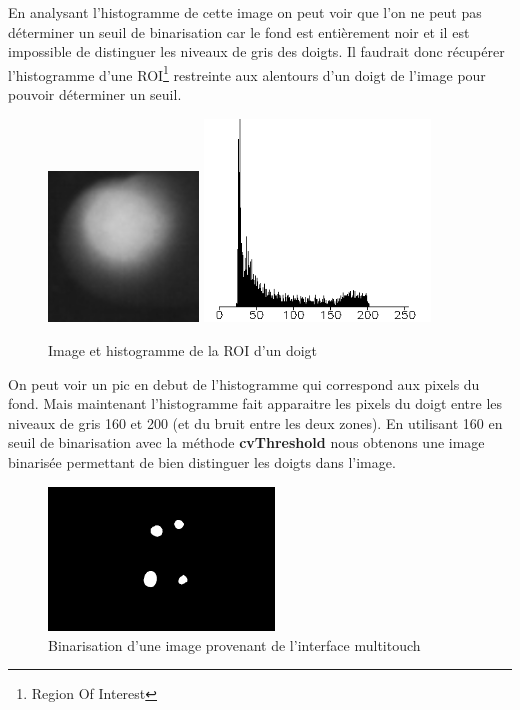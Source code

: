 En analysant l'histogramme de cette image on peut voir que l'on ne peut pas déterminer un seuil de 
binarisation car le fond est entièrement noir et il est impossible de distinguer les niveaux de gris des doigts.
Il faudrait donc récupérer l'histogramme d'une ROI\footnote{Region Of Interest} restreinte aux alentours d'un doigt de l'image pour pouvoir déterminer un seuil.

\begin{figure}[H]
      \center
      \includegraphics[width=4cm]{ressources/tp4/roi.png}
      \includegraphics[width=6cm]{ressources/tp4/histoROI.png}
      \caption{Image et histogramme de la ROI d'un doigt}
\end{figure}

On peut voir un pic en debut de l'histogramme qui correspond aux pixels du fond. Mais maintenant 
l'histogramme fait apparaitre les pixels du doigt entre les niveaux de gris 160 et 200 (et du bruit entre les deux zones).
En utilisant 160 en seuil de binarisation avec la méthode \textbf{cvThreshold} nous obtenons une 
image binarisée permettant de bien distinguer les doigts dans l'image.

\begin{figure}[H]
      \center
      \includegraphics[width=6cm]{ressources/tp4/binarisation.png}
      \caption{Binarisation d'une image provenant de l'interface multitouch}
\end{figure}

